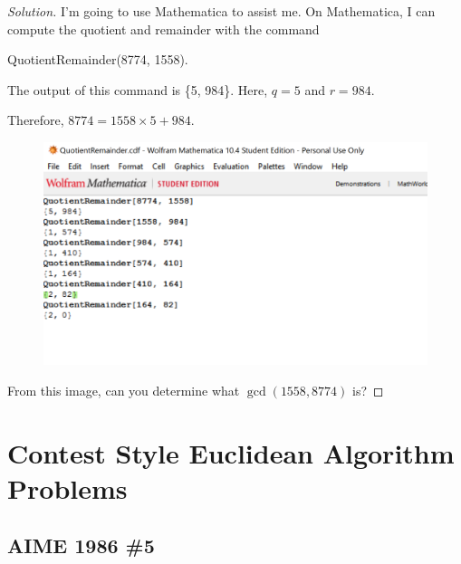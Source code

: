 \begin{proof}[Solution]
	
I'm going to use Mathematica to assist me. On Mathematica, I can compute the quotient and remainder with the command \begin{center} QuotientRemainder(8774, 1558). \end{center}

The output of this command is \{5, 984\}. Here, $q=5$ and $r=984$.  

Therefore, $8774=1558\times 5+984.$

\clearpage

\begin{figure}[h]
	\centering\includegraphics[width=0.7\linewidth]{images/quotient.png}
\end{figure}

From this image, can you determine what $\gcd(1558, 8774)$ is?

\end{proof} 

\clearpage

\section{Contest Style Euclidean Algorithm Problems}

\subsection{AIME 1986 \#5}

